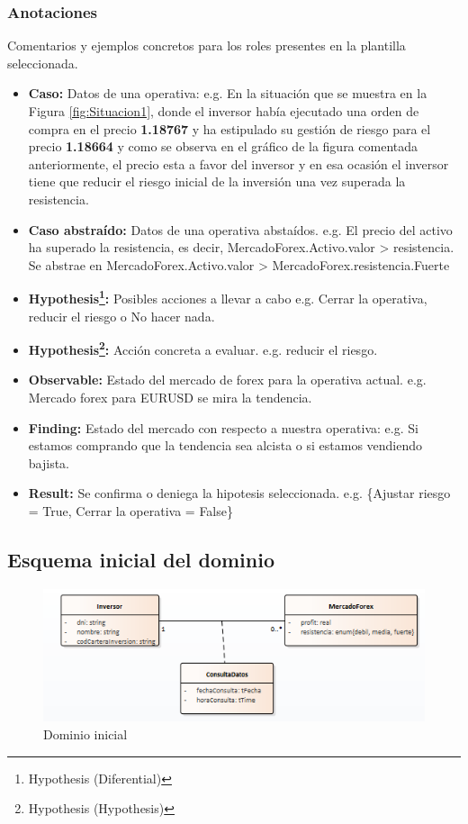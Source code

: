 \subsubsection{Anotaciones}
Comentarios y ejemplos concretos para los roles presentes en la plantilla seleccionada.
\begin{itemize}
  \item \textbf{Caso:} Datos de una operativa: e.g. En la situación que se muestra en la Figura \ref{fig:Situacion1}, donde el inversor había ejecutado una orden de compra en el precio \textbf{1.18767} y ha estipulado su gestión de riesgo para el precio \textbf{1.18664} y como se observa en el gráfico de la figura comentada anteriormente, el precio esta a favor del inversor y en esa ocasión el inversor tiene que reducir el riesgo inicial de la inversión una vez superada la resistencia.
  \item \textbf{Caso abstraído:} Datos de una operativa abstaídos. e.g. El precio del activo ha superado la resistencia, es decir, MercadoForex.Activo.valor > resistencia. Se abstrae en MercadoForex.Activo.valor > MercadoForex.resistencia.Fuerte
  \item \textbf{Hypothesis\footnote{Hypothesis (Diferential)}:} Posibles acciones a llevar a cabo e.g. Cerrar la operativa, reducir el riesgo o No hacer nada.
  \item \textbf{Hypothesis\footnote{Hypothesis (Hypothesis)}:} Acción concreta a evaluar. e.g. reducir el riesgo.
  \item \textbf{Observable:} Estado del mercado de forex para la operativa actual. e.g. Mercado forex para EURUSD se mira la tendencia.
  \item \textbf{Finding:} Estado del mercado con respecto a nuestra operativa: e.g. Si estamos comprando que la tendencia sea alcista o si estamos vendiendo bajista.
  \item \textbf{Result:} Se confirma o deniega la hipotesis seleccionada. e.g. \{Ajustar riesgo = True, Cerrar la operativa = False\} 
\end{itemize}

\subsection{Esquema inicial del dominio}

\begin{figure}[H]
  \centering
  \includegraphics[scale=0.90]{imagenes/DominioInicial.png}
  \caption{\label{fig:DominioInicial}Dominio inicial}
\end{figure}

